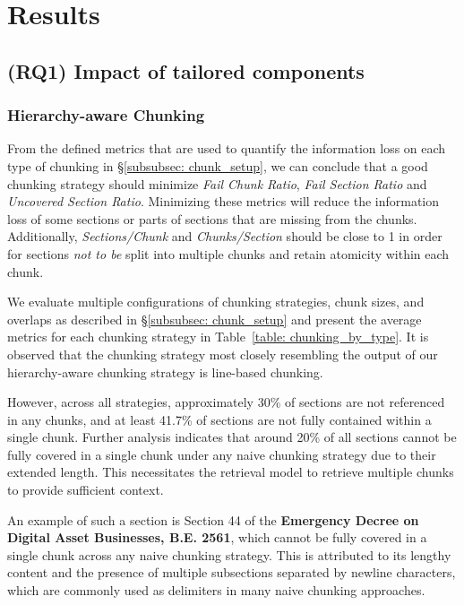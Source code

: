 \section{Results}
\subsection{(RQ1) Impact of tailored components}
\label{subsec: rq1_result}

\subsubsection{Hierarchy-aware Chunking}
\label{subsubsec: chunking_result}

From the defined metrics that are used to quantify the information loss on each type of chunking in \S\ref{subsubsec: chunk_setup}, we can conclude that a good chunking strategy should minimize \textit{Fail Chunk Ratio}, \textit{Fail Section Ratio} and \textit{Uncovered Section Ratio}.
%
Minimizing these metrics will reduce the information loss of some sections or parts of sections that are missing from the chunks.
%
Additionally, \textit{Sections/Chunk} and \textit{Chunks/Section} should be close to 1 in order for sections \emph{not to be} split into multiple chunks and retain atomicity within each chunk.

We evaluate multiple configurations of chunking strategies, chunk sizes, and overlaps as described in \S\ref{subsubsec: chunk_setup} and present the average metrics for each chunking strategy in Table~\ref{table: chunking_by_type}. 
%
It is observed that the chunking strategy most closely resembling the output of our hierarchy-aware chunking strategy is line-based chunking. 

However, across all strategies, approximately 30\% of sections are not referenced in any chunks, and at least 41.7\% of sections are not fully contained within a single chunk. 
%
Further analysis indicates that around 20\% of all sections cannot be fully covered in a single chunk under any naive chunking strategy due to their extended length. 
%
This necessitates the retrieval model to retrieve multiple chunks to provide sufficient context.

An example of such a section is Section 44 of the \textbf{Emergency Decree on Digital Asset Businesses, B.E. 2561}, which cannot be fully covered in a single chunk across any naive chunking strategy. 
%
This is attributed to its lengthy content and the presence of multiple subsections separated by newline characters, which are commonly used as delimiters in many naive chunking approaches.

